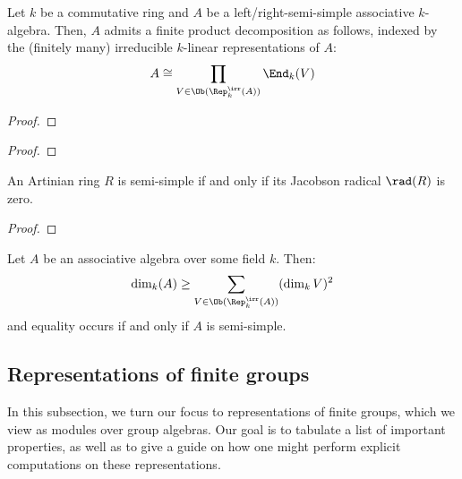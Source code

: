             \begin{theorem} \label{theorem: artin_wedderburn}
                Let $k$ be a commutative ring and $A$ be a left/right-semi-simple associative $k$-algebra. Then, $A$ admits a finite product decomposition as follows, indexed by the (finitely many) irreducible $k$-linear representations of $A$:
                    $$A \cong \prod_{V \in \Ob(\Rep_k^{\irr}(A))} \End_k(V)$$
            \end{theorem}
                \begin{proof}
                    
                \end{proof}
            \begin{corollary} \label{coro: artin_wedderburn_over_fields}
                
            \end{corollary}
                \begin{proof}
                    
                \end{proof}
            \begin{proposition} \label{prop: semi_simple_iff_trivial_jacobson_radical_and_artinian}
                An Artinian ring $R$ is semi-simple if and only if its Jacobson radical $\rad(R)$ is zero.
            \end{proposition}
                \begin{proof}
                    
                \end{proof}
            \begin{corollary} \label{coro: sum_of_squares_formula_for_semi_simple_algebras}
                Let $A$ be an associative algebra over some field $k$. Then:
                    $$\dim_k(A) \geq \sum_{V \in \Ob(\Rep_k^{\irr}(A))} (\dim_k V)^2$$
                and equality occurs if and only if $A$ is semi-simple.
            \end{corollary}
        
    \subsection{Representations of finite groups}
        In this subsection, we turn our focus to representations of finite groups, which we view as modules over group algebras. Our goal is to tabulate a list of important properties, as well as to give a guide on how one might perform explicit computations on these representations.
        
